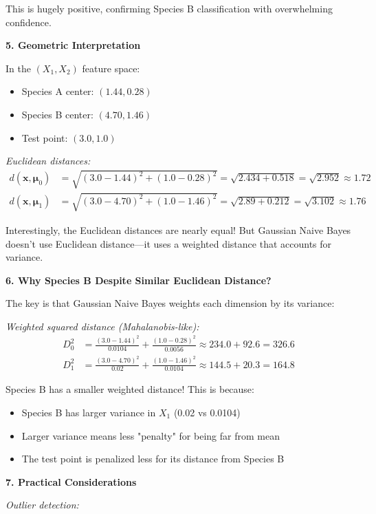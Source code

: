 \documentclass[12pt]{article}
\begin{document}
\begin{explanation}
This is hugely positive, confirming Species B classification with overwhelming confidence.

\textbf{5. Geometric Interpretation}

In the $(X_1, X_2)$ feature space:
\begin{itemize}
    \item Species A center: $(1.44, 0.28)$
    \item Species B center: $(4.70, 1.46)$
    \item Test point: $(3.0, 1.0)$
\end{itemize}

\textit{Euclidean distances:}
\begin{align}
d(\mathbf{x}, \boldsymbol{\mu}_0) &= \sqrt{(3.0-1.44)^2 + (1.0-0.28)^2} = \sqrt{2.434 + 0.518} = \sqrt{2.952} \approx 1.72 \\
d(\mathbf{x}, \boldsymbol{\mu}_1) &= \sqrt{(3.0-4.70)^2 + (1.0-1.46)^2} = \sqrt{2.89 + 0.212} = \sqrt{3.102} \approx 1.76
\end{align}

Interestingly, the Euclidean distances are nearly equal! But Gaussian Naive Bayes doesn't use Euclidean distance—it uses a weighted distance that accounts for variance.

\textbf{6. Why Species B Despite Similar Euclidean Distance?}

The key is that Gaussian Naive Bayes weights each dimension by its variance:

\textit{Weighted squared distance (Mahalanobis-like):}
\begin{align}
D_0^2 &= \frac{(3.0-1.44)^2}{0.0104} + \frac{(1.0-0.28)^2}{0.0056} \approx 234.0 + 92.6 = 326.6 \\
D_1^2 &= \frac{(3.0-4.70)^2}{0.02} + \frac{(1.0-1.46)^2}{0.0104} \approx 144.5 + 20.3 = 164.8
\end{align}

Species B has a smaller weighted distance! This is because:
\begin{itemize}
    \item Species B has larger variance in $X_1$ (0.02 vs 0.0104)
    \item Larger variance means less "penalty" for being far from mean
    \item The test point is penalized less for its distance from Species B
\end{itemize}

\textbf{7. Practical Considerations}

\textit{Outlier detection:}


\end{explanation}
\end{document}
